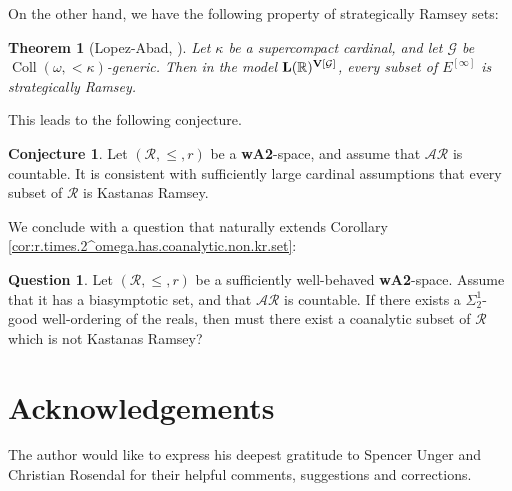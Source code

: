 \documentclass[11pt,reqno]{amsart}
\theoremstyle{plain}
\numberwithin{equation}{section}
\newtheorem{theorem}{Theorem}[section]
\theoremstyle{definition}
\newtheorem{qn}{Question}
\newtheorem*{conjecture}{Conjecture}
\newcommand{\func}{\operatorname}
\newcommand{\R}{\mathbb{R}}
\newcommand{\cal}{\mathcal}
\renewcommand{\bf}{\mathbf}
\newcommand{\V}{\bf{V}}
\newcommand{\G}{\cal{G}}
\let\strokeL\L
\DeclareRobustCommand{\L}{\ifmmode\mathbf{L}\else\strokeL\fi}
\begin{document}
On the other hand, we have the following property of strategically Ramsey sets:

\begin{theorem}[Lopez-Abad, \cite{L05}]
    Let $\kappa$ be a supercompact cardinal, and let $\G$ be $\func{Coll}(\omega,<\kappa)$-generic. Then in the model $\L(\R)^{\V[\G]}$, every subset of $E^{[\infty]}$ is strategically Ramsey.
\end{theorem}

This leads to the following conjecture.

\begin{conjecture}
    Let $(\cal{R},\leq,r)$ be a \textbf{wA2}-space, and assume that $\cal{AR}$ is countable. It is consistent with sufficiently large cardinal assumptions that every subset of $\cal{R}$ is Kastanas Ramsey.
\end{conjecture}

We conclude with a question that naturally extends Corollary \ref{cor:r.times.2^omega.has.coanalytic.non.kr.set}:

\begin{qn}
\label{qn:analytic.non.kr.set}
    Let $(\cal{R},\leq,r)$ be a sufficiently well-behaved \textbf{wA2}-space. Assume that it has a biasymptotic set, and that $\cal{AR}$ is countable. If there exists a $\Sigma_2^1$-good well-ordering of the reals, then must there exist a coanalytic subset of $\cal{R}$ which is not Kastanas Ramsey?
\end{qn}

\section*{Acknowledgements}
The author would like to express his deepest gratitude to Spencer Unger and Christian Rosendal for their helpful comments, suggestions and corrections.



\end{document}
